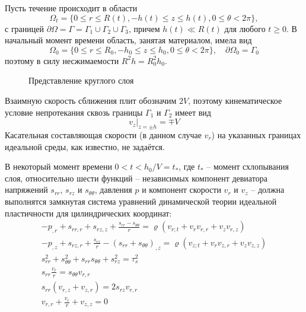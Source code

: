 Пусть течение происходит в области
\begin{equation}
  \Omega_{t} = \{0 \le r \le R(t), -h(t) \le z \le h(t), 0 \le \theta < 2\pi\},
\end{equation}
с границей $\partial\Omega = \Gamma = \Gamma_{1} \cup \Gamma_{2} \cup \Gamma_{3}$, причем $h(t) \ll R(t)$ для любого $t \ge 0$. В начальный момент времени область, занятая материалом, имела вид
\begin{equation}
  \Omega_{0} = \{0 \le r \le R_{0}, -h_{0} \le z \le h_{0}, 0 \le \theta < 2\pi\}, \quad \partial\Omega_{0} = \Gamma_{0}
\end{equation}
поэтому в силу несжимаемости $R^{2} h=R^{2}_{0} h_{0}$.

\begin{figure}[ht]
  \caption{Представление круглого слоя}
  \label{fig:ch1/layer}
\end{figure}
Взаимную скорость сближения плит обозначим $2V$, поэтому кинематическое условие непротекания сквозь границы $\Gamma_{1}$ и $\Gamma_{2}$ имеет вид
\begin{equation}
  \label{eq:ch1/sec1/boundary/kinematic}
  v_{z}\lvert_{z=\pm h} = \mp V
\end{equation}
Касательная составляющая скорости (в данном случае $v_{r}$) на указанных границах идеальной среды, как известно, не задаётся.

В некоторый момент времени $0 < t < h_{0}/V = t_*$, где $t_*$ -- момент схлопывания слоя, относительно шести функций -- независимых компонент девиатора напряжений $s_{rr}$, $s_{rz}$ и $s_{\theta\theta}$, давления $p$ и компонент скорости $v_{r}$ и $v_{z}$ -- должна выполнятся замкнутая система уравнений динамической теории идеальной пластичности для цилиндрических координат:
\begin{gather}
  \label{eqs:ch1/sec1/general/motion:1}
  -p_{,r}+s_{rr,r}+s_{rz,z}+\frac{s_{rr}-s_{\theta\theta}}{r} = \varrho \left(v_{r;t}+v_{r} v_{r,r} + v_{z} v_{r,z} \right)
  \\
  \label{eqs:ch1/sec1/general/motion:2}
  -p_{,z}+s_{rz,r}+\frac{s_{rz}}{r}-(s_{rr}+s_{\theta\theta})_{,z} = \varrho \left(v_{z;t}+v_{r} v_{z,r} + v_{z} v_{z,z} \right)
  \\
  \label{eqs:ch1/sec1/general/plasticity}
  s^2_{rr}+s^2_{\theta\theta}+s_{rr} s_{\theta\theta} + s^2_{rz}=\tau^2_{s}
  \\
  \label{eqs:ch1/sec1/general/coax:1}
  s_{rr} \frac{v_{r}}{r} = s_{\theta\theta} v_{r,r}
  \\
  \label{eqs:ch1/sec1/general/coax:2}
  s_{rr} (v_{r,z}+v_{z,r}) = 2 s_{rz} v_{r,r}
  \\
  \label{eqs:ch1/sec1/general/uncompress}
  v_{r,r}+\frac{v_{r}}{r}+v_{z,z} = 0
\end{gather}

